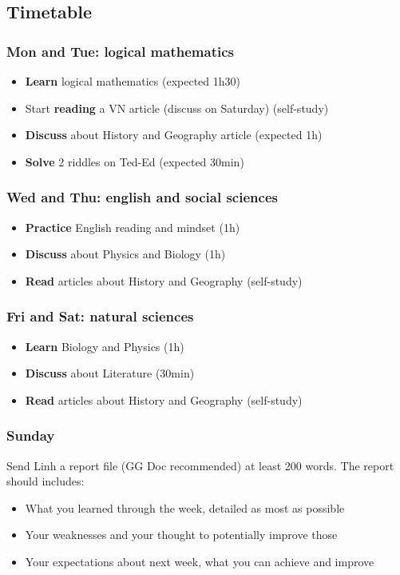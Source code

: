 \documentclass{beamer}
\begin{document}
\subsection{Timetable}
\begin{frame}
    \frametitle{Mon and Tue: logical mathematics}
\begin{itemize}
    \item \textbf{Learn} logical mathematics (expected 1h30)
    \item Start \textbf{reading} a VN article (discuss on Saturday) (self-study)
    \item \textbf{Discuss} about History and Geography article (expected 1h)
    \item \textbf{Solve} 2 riddles on Ted-Ed (expected 30min)
\end{itemize}
\end{frame}
\begin{frame}
    \frametitle{Wed and Thu: english and social sciences}
\begin{itemize}
    \item \textbf{Practice} English reading and mindset (1h)
    \item \textbf{Discuss} about Physics and Biology (1h)
    \item \textbf{Read} articles about History and Geography (self-study)
\end{itemize}
\end{frame}
\begin{frame}
    \frametitle{Fri and Sat: natural sciences}
\begin{itemize}
    \item \textbf{Learn} Biology and Physics (1h)
    \item \textbf{Discuss} about Literature (30min)
    \item \textbf{Read} articles about History and Geography (self-study)
\end{itemize}
\end{frame}
\begin{frame}
    \frametitle{Sunday}
    Send Linh a report file (GG Doc recommended) at least 200 words. The report should includes:
\begin{itemize}
    \item What you learned through the week, detailed as most as possible
    \item Your weaknesses and your thought to potentially improve those
    \item Your expectations about next week, what you can achieve and improve
\end{itemize}
\end{frame}
\end{document}
